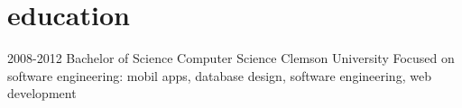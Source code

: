 
\section{education}

\begin{entrylist}


\entry
{2008-2012}
{Bachelor of Science {\normalfont Computer Science}}
{Clemson University}
{Focused on software engineering: mobil apps, database design, software engineering, web development}


\end{entrylist}
